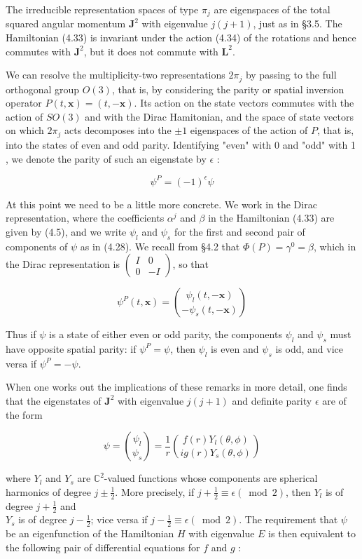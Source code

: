 \documentclass[10pt, letterpaper]{article}
\begin{document}
The irreducible representation spaces of type $\pi_{j}$ are eigenspaces of the total squared angular momentum $\mathbf{J}^{2}$ with eigenvalue $j(j+1)$, just as in §3.5. The Hamiltonian (4.33) is invariant under the action (4.34) of the rotations and hence commutes with $\mathbf{J}^{2}$, but it does not commute with $\mathbf{L}^{2}$.

We can resolve the multiplicity-two representations $2 \pi_{j}$ by passing to the full orthogonal group $O(3)$, that is, by considering the parity or spatial inversion operator $P(t, \mathbf{x})=(t,-\mathbf{x})$. Its action on the state vectors commutes with the action of $S O(3)$ and with the Dirac Hamitonian, and the space of state vectors on which $2 \pi_{j}$ acts decomposes into the $\pm 1$ eigenspaces of the action of $P$, that is, into the states of even and odd parity. Identifying "even" with 0 and "odd" with 1 , we denote the parity of such an eigenstate by $\epsilon$ :

$$
\psi^{P}=(-1)^{\epsilon} \psi
$$

At this point we need to be a little more concrete. We work in the Dirac representation, where the coefficients $\alpha^{j}$ and $\beta$ in the Hamiltonian (4.33) are given by (4.5), and we write $\psi_{l}$ and $\psi_{s}$ for the first and second pair of components of $\psi$ as in (4.28). We recall from §4.2 that $\Phi(P)=\gamma^{0}=\beta$, which in the Dirac representation is $\left(\begin{array}{cc}I & 0 \\ 0 & -I\end{array}\right)$, so that

$$
\psi^{P}(t, \mathbf{x})=\binom{\psi_{l}(t,-\mathbf{x})}{-\psi_{s}(t,-\mathbf{x})}
$$

Thus if $\psi$ is a state of either even or odd parity, the components $\psi_{l}$ and $\psi_{s}$ must have opposite spatial parity: if $\psi^{P}=\psi$, then $\psi_{l}$ is even and $\psi_{s}$ is odd, and vice versa if $\psi^{P}=-\psi$.

When one works out the implications of these remarks in more detail, one finds that the eigenstates of $\mathbf{J}^{2}$ with eigenvalue $j(j+1)$ and definite parity $\epsilon$ are of the form

$$
\psi=\binom{\psi_{l}}{\psi_{s}}=\frac{1}{r}\binom{f(r) Y_{l}(\theta, \phi)}{i g(r) Y_{s}(\theta, \phi)}
$$

where $Y_{l}$ and $Y_{s}$ are $\mathbb{C}^{2}$-valued functions whose components are spherical harmonics of degree $j \pm \frac{1}{2}$. More precisely, if $j+\frac{1}{2} \equiv \epsilon(\bmod 2)$, then $Y_{l}$ is of degree $j+\frac{1}{2}$ and\\
$Y_{s}$ is of degree $j-\frac{1}{2}$; vice versa if $j-\frac{1}{2} \equiv \epsilon(\bmod 2)$. The requirement that $\psi$ be an eigenfunction of the Hamiltonian $H$ with eigenvalue $E$ is then equivalent to the following pair of differential equations for $f$ and $g$ :
\end{document}

